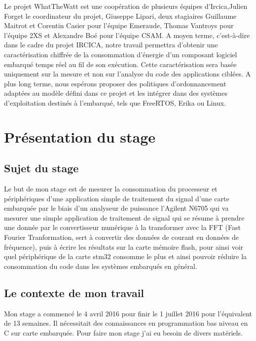\documentclass[a4paper]{article}
\begin{document}
Le projet WhatTheWatt est une coopération de plusieurs équipes d'Ircica,Julien Forget le coordinateur du projet, Giuseppe Lipari, deux stagiaires Guillaume Maitrot et Corentin Casier pour l'équipe Emeraude, Thomas Vantroys pour l'équipe 2XS et Alexandre Boé pour l'équipe CSAM. 
A moyen terme, c’est-à-dire dans le cadre du projet IRCICA, notre travail permettra d’obtenir une caractérisation chiffrée de la consommation d’énergie d’un composant logiciel embarqué temps réel au fil de son exécution. Cette caractérisation sera basée uniquement sur la mesure et non sur l’analyse du code des applications ciblées. A plus long terme, nous espérons proposer des politiques d’ordonnancement adaptées au modèle défini dans ce projet et les intégrer dans des systèmes d’exploitation destinés à l’embarqué, tels que FreeRTOS, Erika ou Linux.

\section{Présentation du stage}

\subsection{Sujet du stage}

Le but de mon stage est de mesurer la consommation du processeur et périphériques d'une application simple de traitement du signal d'une carte embarquée par le biais d'un analyseur de puissance l'Agilent N6705 qui va mesurer une simple application de traitement de signal qui se résume à prendre une donnée par le convertisseur numérique à la transformer avec la FFT (Fast Fourier Tranformation, sert à convertir des données de courant en données de fréquence), puis à écrire les résultats sur la carte mémoire flash, pour ainsi voir quel périphérique de la carte stm32 consomme le plus et ainsi pouvoir réduire la consommation du code dans les systèmes embarqués en général. 


\subsection{Le contexte de mon travail}

 Mon stage a commencé le 4 avril 2016 pour finir le 1 juillet 2016 pour l'équivalent de 13 semaines. Il nécessitait des connaissances en programmation bas niveau en C sur carte embarquée. Pour faire mon stage j'ai eu besoin de divers matériels.
\end{document}
